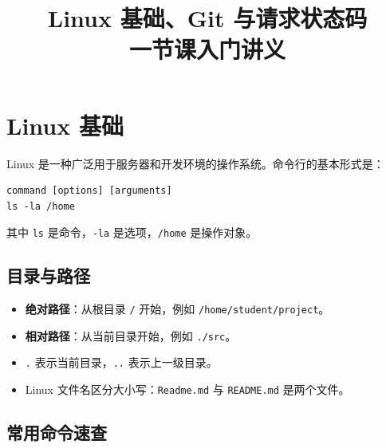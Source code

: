 \documentclass[11pt,a4paper]{ctexart}
\title{\textbf{Linux 基础、Git 与请求状态码}\\\large 一节课入门讲义}
\author{}
\date{}
\newcommand{\key}[1]{\textcolor{accent}{\textbf{#1}}}
\begin{document}
\maketitle
\vspace{-2em}

\begin{center}
\end{center}

\section{Linux 基础}

Linux 是一种广泛用于服务器和开发环境的操作系统。命令行的基本形式是：

\begin{lstlisting}
command [options] [arguments]
ls -la /home
\end{lstlisting}

其中 \texttt{ls} 是命令，\texttt{-la} 是选项，\texttt{/home} 是操作对象。

\subsection{目录与路径}

\begin{itemize}
  \item \key{绝对路径}：从根目录 \texttt{/} 开始，例如 \texttt{/home/student/project}。
  \item \key{相对路径}：从当前目录开始，例如 \texttt{./src}。
  \item \texttt{.} 表示当前目录，\texttt{..} 表示上一级目录。
  \item Linux 文件名区分大小写：\texttt{Readme.md} 与 \texttt{README.md} 是两个文件。
\end{itemize}

\subsection{常用命令速查}
\end{document}
